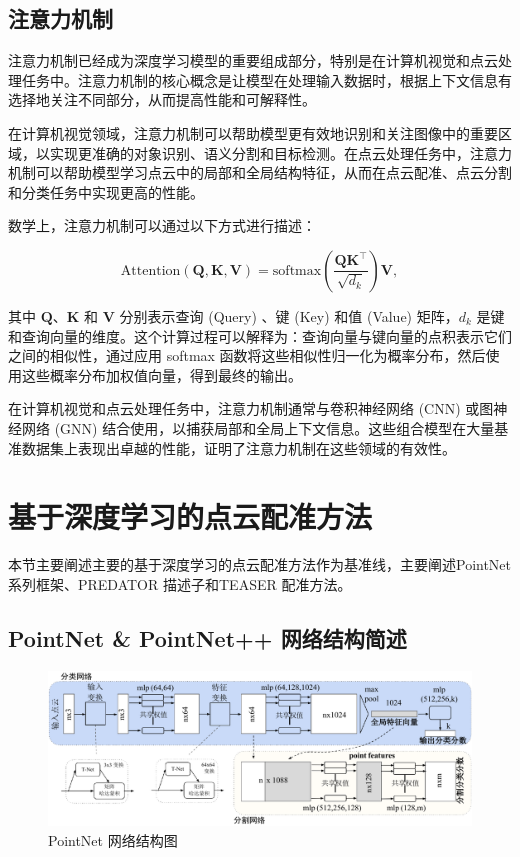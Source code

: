 \subsection{注意力机制}
注意力机制已经成为深度学习模型的重要组成部分，特别是在计算机视觉和点云处理任务中。注意力机制的核心概念是让模型在处理输入数据时，根据上下文信息有选择地关注不同部分，从而提高性能和可解释性。

在计算机视觉领域，注意力机制可以帮助模型更有效地识别和关注图像中的重要区域，以实现更准确的对象识别、语义分割和目标检测。在点云处理任务中，注意力机制可以帮助模型学习点云中的局部和全局结构特征，从而在点云配准、点云分割和分类任务中实现更高的性能。

数学上，注意力机制可以通过以下方式进行描述：

\begin{equation}
\text{Attention}(\boldsymbol{Q}, \boldsymbol{K}, \boldsymbol{V}) = \text{softmax}(\frac{\boldsymbol{Q}\boldsymbol{K}^\top}{\sqrt{d_k}})\boldsymbol{V},
\end{equation}

其中 $\boldsymbol{Q}$、$\boldsymbol{K}$ 和 $\boldsymbol{V}$ 分别表示查询 (Query) 、键 (Key) 和值 (Value) 矩阵，$d_k$ 是键和查询向量的维度。这个计算过程可以解释为：查询向量与键向量的点积表示它们之间的相似性，通过应用 softmax 函数将这些相似性归一化为概率分布，然后使用这些概率分布加权值向量，得到最终的输出。

在计算机视觉和点云处理任务中，注意力机制通常与卷积神经网络 (CNN) 或图神经网络 (GNN) 结合使用，以捕获局部和全局上下文信息。这些组合模型在大量基准数据集上表现出卓越的性能，证明了注意力机制在这些领域的有效性。


\section{基于深度学习的点云配准方法}
本节主要阐述主要的基于深度学习的点云配准方法作为基准线，主要阐述PointNet\cite{qi2017pointnet, qi2017pointnet++} 系列框架、PREDATOR\cite{huang2021predator} 描述子和TEASER\cite{yang2020teaser} 配准方法。

\subsection{PointNet \& PointNet++ 网络结构简述}
\begin{figure}
    \centering
    \includegraphics[width=\linewidth]{images/pointnet.pdf}
    \caption{PointNet\cite{qi2017pointnet} 网络结构图}
    \label{fig:pointnet}
    \vspace{-5mm}
\end{figure}

